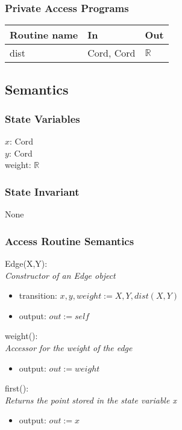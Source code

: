 \documentclass[12pt]{article}
\begin{document}
\subsubsection* {Private Access Programs}

\begin{tabular}{| l | l | l |}
\hline
\textbf{Routine name} & \textbf{In} & \textbf{Out}\\
\hline
dist & Cord, Cord & $\mathbb{R}$ \\
\hline
\end{tabular}

\subsection* {Semantics}

\subsubsection* {State Variables}

$x$: Cord\\
$y$: Cord\\
weight: $\mathbb{R}$

\subsubsection* {State Invariant}

None

\subsubsection* {Access Routine Semantics}

Edge(X,Y):\\
\textit{Constructor of an Edge object}
\begin{itemize}
\item transition: $x, y, weight := X, Y, dist(X,Y)$
\item output: $out := \mathit{self}$
\end{itemize}

\noindent
weight():\\
\textit{Accessor for the weight of the edge}
\begin{itemize}
\item output: $out := weight$
\end{itemize}

\noindent
first():\\
\textit{Returns the point stored in the state variable x}
\begin{itemize}
\item output: $out := x$
\end{itemize}
\end{document}
